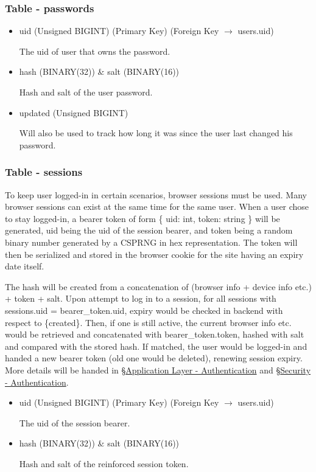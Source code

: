 \documentclass[12pt]{report}
\newcommand{\n}{\par}
\begin{document}
\subsubsection{Table - passwords} \label{data-layer.design.user-system.passwords}
\begin{itemize}
	\item uid (Unsigned BIGINT) (Primary Key) (Foreign Key $\rightarrow$ users.uid)\n
	      The uid of user that owns the password.
	\item hash (BINARY(32)) \& salt (BINARY(16))\n
	      Hash and salt of the user password.
	\item updated (Unsigned BIGINT)\n
	      Will also be used to track how long it was since the user last changed his password.
\end{itemize}

\subsubsection{Table - sessions} \label{data-layer.design.user-system.sessions}
To keep user logged-in in certain scenarios, browser sessions must be used.
Many browser sessions can exist at the same time for the same user.
When a user chose to stay logged-in, a bearer token of form
\{ uid: int, token: string \}
will be generated,
uid being the uid of the session bearer, and
token being a random binary number generated by a CSPRNG in hex representation.
The token will then be serialized and stored in the browser cookie for the site having an expiry date itself.\n
The hash will be created from a concatenation of (browser info + device info etc.) + token + salt.
Upon attempt to log in to a session,
for all sessions with sessions.uid = bearer\_token.uid,
expiry would be checked in backend with respect to \{created\}.
Then, if one is still active, the current browser info etc. would be retrieved and concatenated with bearer\_token.token,
hashed with salt and compared with the stored hash.
If matched, the user would be logged-in and handed a new bearer token (old one would be deleted), renewing session expiry.
More details will be handed in \S \hyperref[application-layer.implementation.authentication]{Application Layer - Authentication} and
\S \hyperref[security.authentication]{Security - Authentication}.
\begin{itemize}
	\item uid (Unsigned BIGINT) (Primary Key) (Foreign Key $\rightarrow$ users.uid)\n
	      The uid of the session bearer.
	\item hash (BINARY(32)) \& salt (BINARY(16))\n
	      Hash and salt of the reinforced session token.
\end{itemize}
\end{document}

